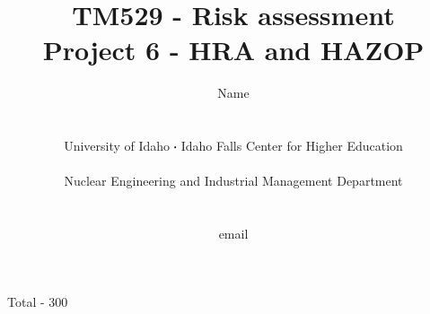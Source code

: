 \documentclass[11pt,a4paper]{article}
\newcommand*\sq{\mathbin{\vcenter{\hbox{\rule{.3ex}{.3ex}}}}} %
\begin{document}
\begin{titlepage}
    \title{
        TM529 - Risk assessment\\
        Project 6 - HRA and HAZOP\\
    }
    \author{
        Name
        \\ \\ \\
        University of Idaho $\sq$ Idaho Falls Center for Higher Education
        \\ \\
        Nuclear Engineering and Industrial Management Department
        \\ \\ \\
        email 
    }
\clearpage %
\maketitle
\vspace*{\fill}
\begin{flushright}{
        Total - 300
}
\end{flushright}
\thispagestyle{empty} %
\end{titlepage}
\end{document}
